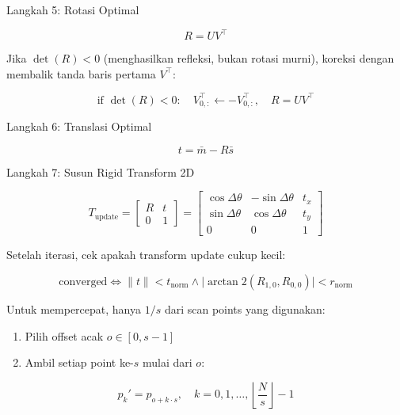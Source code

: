 Langkah 5: Rotasi Optimal

\begin{equation}R = U V^\top\end{equation}

Jika $\det(R) < 0$ (menghasilkan refleksi, bukan rotasi murni), koreksi dengan membalik tanda baris pertama $V^\top$:

\begin{equation}\text{if } \det(R) < 0: \quad V^\top_{0,:} \gets -V^\top_{0,:}, \quad R = U V^\top\end{equation}

Langkah 6: Translasi Optimal

\begin{equation}t = \bar{m} - R \bar{s}\end{equation}

Langkah 7: Susun Rigid Transform 2D

\begin{equation}T_{\text{update}} = \begin{bmatrix} R & t \\ 0 & 1 \end{bmatrix} = \begin{bmatrix} \cos\Delta\theta & -\sin\Delta\theta & t_x \\ \sin\Delta\theta & \cos\Delta\theta & t_y \\ 0 & 0 & 1 \end{bmatrix}\end{equation}

Setelah iterasi, cek apakah transform update cukup kecil:

\begin{equation}\text{converged} \iff \|t\| < t_{\text{norm}} \land \big|\arctan2(R_{1,0}, R_{0,0})\big| < r_{\text{norm}}\end{equation}


Untuk mempercepat, hanya $1/s$ dari scan points yang digunakan:
\begin{enumerate}
\item Pilih offset acak $o \in [0, s-1]$
\item Ambil setiap point ke-$s$ mulai dari $o$:
\end{enumerate}

\begin{equation}p_k' = p_{o + k \cdot s}, \quad k = 0, 1, \dots, \left\lfloor \frac{N}{s} \right\rfloor - 1\end{equation}



